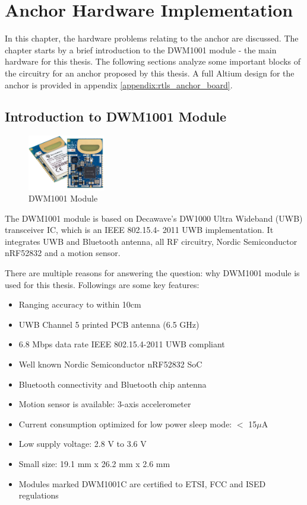 \documentclass[\main/main.tex]{subfiles}
\begin{document}
\graphicspath{{img/}{04_hardware/img/}}
\setlength{\abovecaptionskip}{0pt}
\setlength{\belowcaptionskip}{0pt}

\chapter{Anchor Hardware Implementation}
In this chapter, the hardware problems relating to the anchor are discussed. The chapter starts by a brief introduction to the DWM1001 module - the main hardware for this thesis. The following sections analyze some important blocks of the circuitry for an anchor proposed by this thesis. A full Altium design for the anchor is provided in appendix \ref{appendix:rtls_anchor_board}.

\section{Introduction to DWM1001 Module}
\begin{figure}[H]
    \begin{center}
        \includegraphics[width=0.3\textwidth]{DWM1001-Module_ProdPage_600x430.jpg}
    \end{center}
    \caption{DWM1001 Module}
    \label{fig:dwm1001c_module}
\end{figure}

The DWM1001 module is based on Decawave's DW1000 Ultra
Wideband (UWB) transceiver IC, which is an IEEE 802.15.4-
2011 UWB implementation. It integrates UWB and Bluetooth
antenna, all RF circuitry, Nordic Semiconductor nRF52832 and
a motion sensor.

There are multiple reasons for answering the question: why DWM1001 module is used for this thesis.
Followings are some key features:
\begin{itemize}
    \item Ranging accuracy to within 10cm
    \item UWB Channel 5 printed PCB antenna (6.5 GHz)
    \item 6.8 Mbps data rate IEEE 802.15.4-2011 UWB compliant
    \item Well known Nordic Semiconductor nRF52832 SoC
    \item Bluetooth connectivity and Bluetooth chip antenna
    \item Motion sensor is available: 3-axis accelerometer
    \item Current consumption optimized for low power sleep mode: $<$ 15$\mu$A
    \item Low supply voltage: 2.8 V to 3.6 V
    \item Small size: 19.1 mm x 26.2 mm x 2.6 mm
    \item Modules marked DWM1001C are certified to ETSI, FCC and ISED regulations
\end{itemize}
\end{document}
